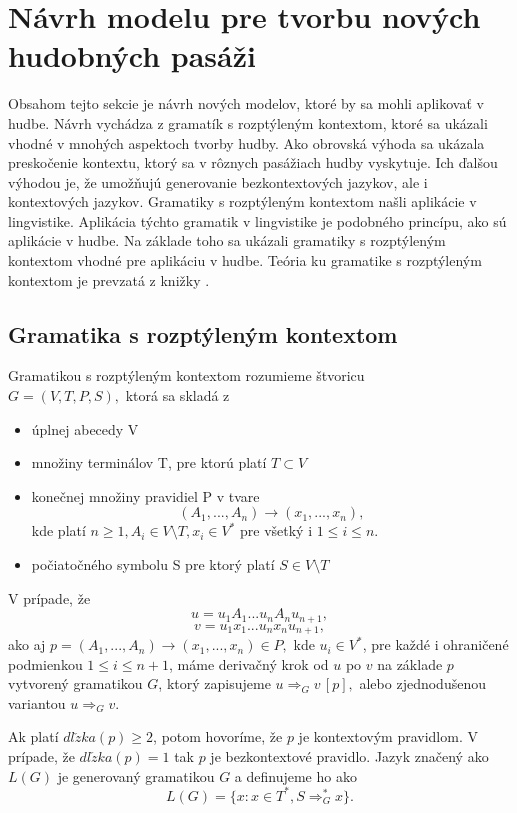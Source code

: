 \chapter{Návrh modelu pre tvorbu nových hudobných pasáži}
\label{chap:app}
Obsahom tejto sekcie je návrh nových modelov, ktoré by sa mohli aplikovať v hudbe. Návrh vychádza z gramatík s rozptýleným kontextom, ktoré sa ukázali vhodné v mnohých aspektoch tvorby hudby. Ako obrovská výhoda sa ukázala preskočenie kontextu, ktorý sa v rôznych pasážiach hudby vyskytuje. Ich ďalšou výhodou je, že umožňujú generovanie bezkontextových jazykov, ale i kontextových jazykov. Gramatiky s rozptýleným kontextom našli aplikácie v lingvistike. Aplikácia týchto gramatik v lingvistike je podobného princípu, ako sú aplikácie v hudbe. Na základe toho sa ukázali gramatiky s rozptýleným kontextom vhodné pre aplikáciu v hudbe. Teória ku gramatike s rozptýleným kontextom je prevzatá z knižky \cite{FITPUB8997}.

\section{Gramatika s rozptýleným kontextom}
\begin{definition}
Gramatikou s rozptýleným kontextom rozumieme štvoricu \\ $G = (V,T,P,S),$ ktorá sa skladá z
\begin{itemize}\itemsep0.05em
    \item úplnej abecedy V 
    \item množiny terminálov T, pre ktorú platí $T \subset V$
    \item konečnej množiny pravidiel P v tvare $$(A_1, ..., A_n) \rightarrow (x_1, ..., x_n),$$ kde platí $n \geq 1, A_i \in V \setminus T, x_i \in V^*$ pre všetký i $1 \leq i \leq n.$
    \item počiatočného symbolu S pre ktorý platí $S \in V \setminus T$
\end{itemize}
\end{definition}

V prípade, že $$u = u_1A_1...u_nA_nu_{n+1},$$$$v = u_1x_1...u_nx_nu_{n+1},$$ ako aj $p = (A_1, ..., A_n) \rightarrow (x_1, ..., x_n) \in P,$ kde $u_i \in V^*$, pre každé i ohraničené podmienkou $1 \leq i \leq n + 1$, máme derivačný krok od $u$ po $v$ na základe $p$ vytvorený gramatikou $G$, ktorý zapisujeme $u \Rightarrow_G v \, [p],$ alebo zjednodušenou variantou $u \Rightarrow_G v$.

Ak platí $dl\check{z}ka(p) \geq 2$, potom hovoríme, že $p$ je kontextovým pravidlom. V prípade, že $dl\check{z}ka(p) = 1$ tak $p$ je bezkontextové pravidlo. Jazyk značený ako $L(G)$ je generovaný gramatikou $G$ a definujeme ho ako $$L(G) = \{x: x \in T^*, S \Rightarrow^*_G x\}.$$


